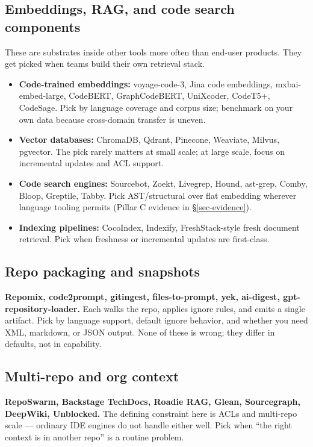 \documentclass[
  11pt,
  letterpaper,
  numbers=noendperiod,
  parskip=half]{scrartcl}
\providecommand{\tightlist}{%
  \setlength{\itemsep}{0pt}\setlength{\parskip}{0pt}}
\begin{document}
\subsection{Embeddings, RAG, and code search components}\label{sec-tools-embed}

These are substrates inside other tools more often than end-user
products. They get picked when teams build their own retrieval stack.

\begin{itemize}
\tightlist
\item
  \textbf{Code-trained embeddings:} voyage-code-3, Jina code embeddings,
  mxbai-embed-large, CodeBERT, GraphCodeBERT, UniXcoder, CodeT5+,
  CodeSage. Pick by language coverage and corpus size; benchmark on
  your own data because cross-domain transfer is uneven.
\item
  \textbf{Vector databases:} ChromaDB, Qdrant, Pinecone, Weaviate,
  Milvus, pgvector. The pick rarely matters at small scale; at large
  scale, focus on incremental updates and ACL support.
\item
  \textbf{Code search engines:} Sourcebot, Zoekt, Livegrep, Hound,
  ast-grep, Comby, Bloop, Greptile, Tabby. Pick AST/structural over flat
  embedding wherever language tooling permits (Pillar C evidence in
  \S\ref{sec-evidence}).
\item
  \textbf{Indexing pipelines:} CocoIndex, Indexify, FreshStack-style
  fresh document retrieval. Pick when freshness or incremental updates
  are first-class.
\end{itemize}

\subsection{Repo packaging and snapshots}\label{sec-tools-pack}

\textbf{Repomix, code2prompt, gitingest, files-to-prompt, yek,
ai-digest, gpt-repository-loader.} Each walks the repo, applies ignore
rules, and emits a single artifact. Pick by language support, default
ignore behavior, and whether you need XML, markdown, or JSON output.
None of these is wrong; they differ in defaults, not in capability.

\subsection{Multi-repo and org context}\label{sec-tools-multi}

\textbf{RepoSwarm, Backstage TechDocs, Roadie RAG, Glean, Sourcegraph,
DeepWiki, Unblocked.} The defining constraint here is ACLs and
multi-repo scale --- ordinary IDE engines do not handle either well.
Pick when ``the right context is in another repo'' is a routine
problem.
\end{document}
